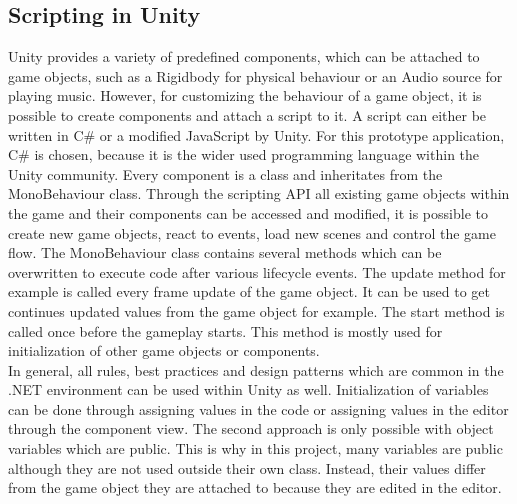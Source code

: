 \subsection{Scripting in Unity}
Unity provides a variety of predefined components, which can be attached to game objects, such as a Rigidbody for physical behaviour or an Audio source for playing music. However, for customizing the behaviour of a game object, it is possible to create components and attach a script to it. A script can either be written in C\# or a  modified JavaScript by Unity. For this prototype application, C\# is chosen, because it is the wider used programming language within the Unity community. Every component is a class and inheritates from the MonoBehaviour class. Through the scripting API all existing game objects within the game and their components can be accessed and modified, it is possible to create new game objects, react to events, load new scenes and control the game flow. The MonoBehaviour class contains several methods which can be overwritten to execute code after various lifecycle events. The update method for example is called every frame update of the game object. It can be used  to get continues updated values from the game object for example. The start method is called once before the gameplay starts. This method is mostly used for initialization of other game objects or components. \cite{?}\\
In general, all rules, best practices and design patterns which are common in the .NET environment can be used within Unity as well. Initialization of variables can be done through assigning values in the code or assigning values in the editor through the component view. The second approach is only possible with object variables which are public. This is why in this project, many variables are public although they are not used outside their own class. Instead, their values differ from the game object they are attached to because they are edited in the editor.
